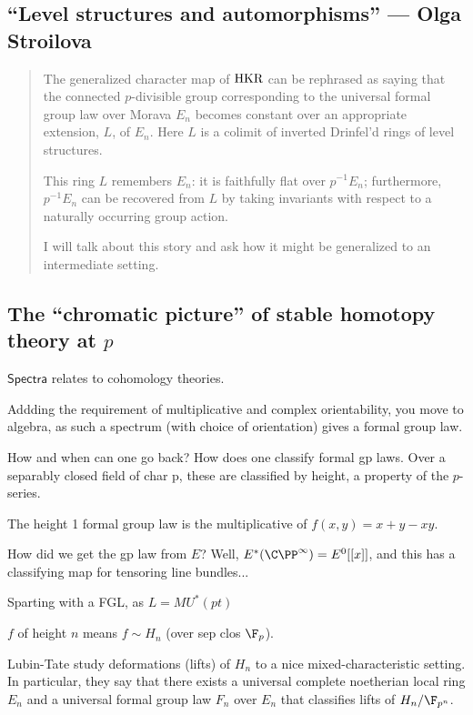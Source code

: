 \documentclass[11pt]{article}
\newcommand{\KanSemResponse}[1]
{
\thispagestyle{fancy}
\subsection*{#1}
}
\begin{document}
\begin{OlgaLevelStructuresAndAutomorphisms}
\KanSemResponse
{``Level structures and automorphisms'' --- Olga Stroilova}
\begin{abstract}
The generalized character map of $\textup{HKR}$ can be rephrased as saying that the connected $p$-divisible group corresponding to the universal formal group law over Morava $E_n$ becomes constant over an appropriate extension, $L$, of $E_n$. Here $L$ is a colimit of inverted Drinfel'd rings of level structures.

This ring $L$ remembers $E_n$: it is faithfully flat over $p^{-1}E_n$; furthermore, $p^{-1} E_n$ can be recovered from $L$ by taking invariants with respect to a naturally occurring group action.

I will talk about this story and ask how it might be generalized to an intermediate setting.
\end{abstract}
\subsection*{The ``chromatic picture'' of stable homotopy theory at $p$}
$\mathsf{Spectra}$ relates to cohomology theories.

Addding the requirement of multiplicative and complex orientability, you move to algebra, as such a spectrum (with choice of orientation) gives a formal group law.

How and when can one go back? How does one classify formal gp laws. Over a separably closed field of char p, these are classified by height, a property of the $p$-series.

The height 1 formal group law is the multiplicative of $f(x,y)=x+y-xy$.

How did we get the gp law from $E$? Well, $E^*(\CP^\infty)=E^0[[x]]$, and this has a classifying map for tensoring line bundles...

Sparting with a FGL, as $L=MU^*(pt)$


$f$ of height $n$ means $f\sim H_n$ (over sep clos $\F_p$).

Lubin-Tate study deformations (lifts) of $H_n$ to a nice mixed-characteristic setting. In particular, they say that there exists a universal complete noetherian local ring $E_n$ and a universal formal group law $F_n$ over $E_n$ that classifies lifts of $H_n/\F_{p^n}$.


\pagebreak
\end{OlgaLevelStructuresAndAutomorphisms}
\end{document}
